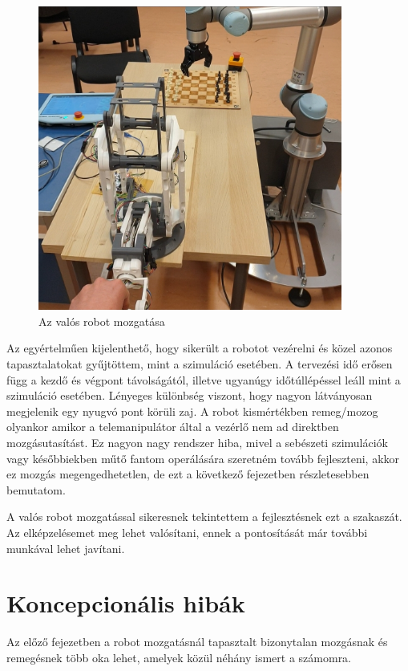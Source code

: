 \begin{figure}[!ht]
\centering
\includegraphics[width=100mm, keepaspectratio]{figures/Robot/Valosrobotszimulacio}
\caption{Az valós robot mozgatása}
\label{fig:valos_robot_mozgatas}
\end{figure}

Az egyértelműen kijelenthető, hogy sikerült a robotot vezérelni és közel azonos tapasztalatokat gyűjtöttem, mint a szimuláció esetében. A tervezési idő erősen függ a kezdő és végpont távolságától, illetve ugyanúgy időtúllépéssel leáll mint a szimuláció esetében. Lényeges különbség viszont, hogy nagyon látványosan megjelenik egy nyugvó pont körüli zaj. A robot kismértékben remeg/mozog olyankor amikor a telemanipulátor által a vezérlő nem ad direktben mozgásutasítást. Ez nagyon nagy rendszer hiba, mivel a sebészeti szimulációk vagy későbbiekben műtő fantom operálására szeretném tovább fejleszteni, akkor ez mozgás megengedhetetlen, de ezt a következő fejezetben részletesebben bemutatom.\citep{moveit}

A valós robot mozgatással sikeresnek tekintettem a fejlesztésnek ezt a szakaszát. Az elképzelésemet meg lehet valósítani, ennek a pontosítását már további munkával lehet javítani. \citep{moveit}

\section{Koncepcionális hibák}

Az előző fejezetben a robot mozgatásnál tapasztalt bizonytalan mozgásnak és remegésnek több oka lehet, amelyek közül néhány ismert a számomra.

